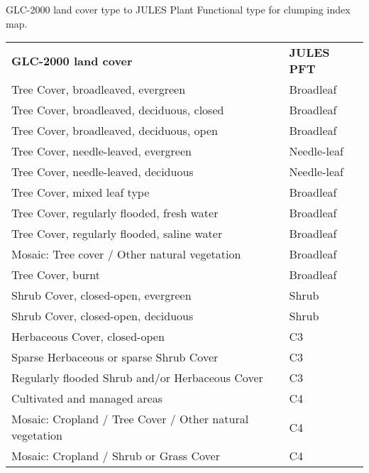 \begin{threeparttable}[ht!]
\centering
\caption{GLC-2000 land cover type to JULES Plant Functional type for clumping index map.}
\begin{tabular}{l{} l{}}
     \hline
     \hline
\textbf{GLC-2000 land cover}   & \textbf{JULES PFT}\\
\noalign{\smallskip}\hline
Tree Cover, broadleaved, evergreen                       & Broadleaf\\ 
Tree Cover, broadleaved, deciduous, closed               & Broadleaf\\
Tree Cover, broadleaved, deciduous, open                 & Broadleaf\\
Tree Cover, needle-leaved, evergreen                     & Needle-leaf\\
Tree Cover, needle-leaved, deciduous                     & Needle-leaf\\
Tree Cover, mixed leaf type                              & Broadleaf\\
Tree Cover, regularly flooded, fresh  water              & Broadleaf\\
Tree Cover, regularly flooded, saline water              & Broadleaf\\
Mosaic: Tree cover / Other natural vegetation            & Broadleaf\\
Tree Cover, burnt                                        & Broadleaf\\
Shrub Cover, closed-open, evergreen                      & Shrub\\
Shrub Cover, closed-open, deciduous                      & Shrub\\
Herbaceous Cover, closed-open                            & C3\\
Sparse Herbaceous or sparse Shrub Cover                  & C3\\
Regularly flooded Shrub and/or Herbaceous Cover          & C3\\
Cultivated and managed areas                             & C4\\
Mosaic: Cropland / Tree Cover / Other natural vegetation & C4\\
Mosaic: Cropland / Shrub or Grass Cover                  & C4\\

\end{tabular}
\end{threeparttable}
